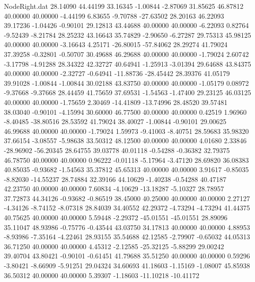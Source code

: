 \begin{filecontents}{NodeRight.dat}
  28.14090   44.44199   33.16345    -1.00844   -2.87069   31.85625   46.87812   40.00000   40.00000   -4.44199    6.83655   -9.70788  -27.63502
  28.20163   46.22093   39.17236    -1.04426   -0.90101   29.12813   43.44688   40.00000   40.00000   -6.22093    0.82764   -9.52439   -8.21784
  28.25232   43.16643   35.74829    -2.90650   -6.27287   29.75313   45.98125   40.00000   40.00000   -3.16643    4.25171  -26.80015  -57.84062
  28.29274   41.79024   37.39258    -0.32801   -0.50707   30.49688   46.29688   40.00000   40.00000   -1.79024    2.60742   -3.17798   -4.91288
  28.34322   42.32727   40.64941    -1.25913   -3.01394   29.64688   43.84375   40.00000   40.00000   -2.32727   -0.64941  -11.88736  -28.45442
  28.39376   41.05179   39.91028    -1.00844   -1.00844   30.02188   43.83750   40.00000   40.00000   -1.05179    0.08972   -9.37668   -9.37668
  28.44459   41.75659   37.69531    -1.54563   -1.47400   29.23125   46.03125   40.00000   40.00000   -1.75659    2.30469  -14.41809  -13.74996
  28.48520   39.57481   38.03040    -0.90101   -4.15994   30.60000   46.77500   40.00000   40.00000    0.42519    1.96960   -8.40485  -38.80516
  28.53592   41.79024   38.40027    -1.00844   -0.90101   29.00625   46.99688   40.00000   40.00000   -1.79024    1.59973   -9.41003   -8.40751
  28.59683   35.98320   37.66154    -3.08557   -5.98638   33.50312   48.12500   40.00000   40.00000    4.01680    2.33846  -28.96902  -56.20345
  28.64755   39.03778   40.01118    -0.54288   -0.36382   32.79375   46.78750   40.00000   40.00000    0.96222   -0.01118   -5.17964   -3.47120
  28.69820   36.08383   40.85035    -0.93682   -1.54563   35.37812   45.65313   40.00000   40.00000    3.91617   -0.85035   -8.82030  -14.55237
  28.74884   32.39166   44.10629    -1.40238   -0.54288   40.47187   42.23750   40.00000   40.00000    7.60834   -4.10629  -13.18287   -5.10327
  28.78957   37.72873   44.34126    -0.93682   -0.86519   38.45000   40.25000   40.00000   40.00000    2.27127   -4.34126   -8.74152   -8.07318
  28.84039   34.40552   42.29372    -4.73294   -4.73294   41.44375   40.75625   40.00000   40.00000    5.59448   -2.29372  -45.01551  -45.01551
  28.89096   35.11047   48.93986    -0.75776   -0.43544   43.03750   34.17813   40.00000   40.00000    4.88953   -8.93986   -7.35164   -4.22461
  28.93155   35.54688   42.12585    -2.79907   -0.65032   44.05313   36.71250   40.00000   40.00000    4.45312   -2.12585  -25.32125   -5.88299
  29.00242   39.40704   43.80421    -0.90101   -0.61451   41.79688   35.51250   40.00000   40.00000    0.59296   -3.80421   -8.66909   -5.91251
  29.04324   34.60693   41.18603    -1.15169   -1.08007   45.85938   36.50312   40.00000   40.00000    5.39307   -1.18603  -11.10218  -10.41172

\end{filecontents}
